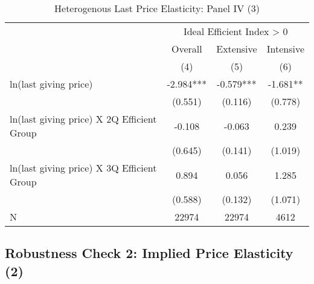 \documentclass[ review  , 3p ]{elsarticle}
\begin{document}
  \begin{table}

  \caption{\label{tab:kableHeteroLastElasticitySlide3}Heterogenous Last Price Elasticity: Panel IV (3)}
  \centering
  \fontsize{8}{10}\selectfont
  \begin{tabular}[t]{lccc}
  \toprule
  \multicolumn{1}{c}{ } & \multicolumn{3}{c}{Ideal Efficient Index > 0} \\
  \cmidrule(l{3pt}r{3pt}){2-4}
  \multicolumn{1}{c}{ } & \multicolumn{1}{c}{Overall} & \multicolumn{1}{c}{Extensive} & \multicolumn{1}{c}{Intensive} \\
  \cmidrule(l{3pt}r{3pt}){2-2} \cmidrule(l{3pt}r{3pt}){3-3} \cmidrule(l{3pt}r{3pt}){4-4}
   & (4) & (5) & (6)\\
  \midrule
  ln(last giving price) & -2.984*** & -0.579*** & -1.681**\\
   & (0.551) & (0.116) & (0.778)\\
  ln(last giving price) X 2Q Efficient Group & -0.108 & -0.063 & 0.239\\
   & (0.645) & (0.141) & (1.019)\\
  ln(last giving price) X 3Q Efficient Group & 0.894 & 0.056 & 1.285\\
   & (0.588) & (0.132) & (1.071)\\
  N & 22974 & 22974 & 4612\\
  \bottomrule
  \end{tabular}
  \end{table}

  \hypertarget{robustness-check-2-implied-price-elasticity-2}{%
  \subsection{Robustness Check 2: Implied Price Elasticity (2)}\label{robustness-check-2-implied-price-elasticity-2}}
\end{document}
